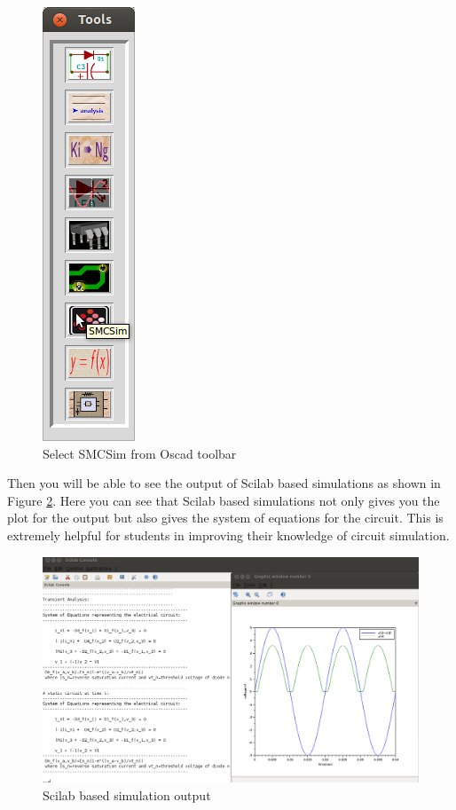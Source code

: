 \begin{figure}[h]%
\begin{center}
\includegraphics[width=0.1\linewidth]{figures/select-SMCSim.png}%
\caption{Select SMCSim from Oscad toolbar}
\label{smc}
\end{center}
\end{figure}

Then you will be able to see the output of Scilab based simulations as shown in Figure \ref{sci}. Here you can see that Scilab based simulations not only gives you the plot for the output but also gives the system of equations for the circuit. This is extremely helpful for students in improving their knowledge of circuit simulation.

\begin{figure}[h]%
\begin{center}
\includegraphics[width=1\linewidth]{figures/SMCSim-simulation.png}%
\caption{Scilab based simulation output}
\label{sci}
\end{center}
\end{figure}





